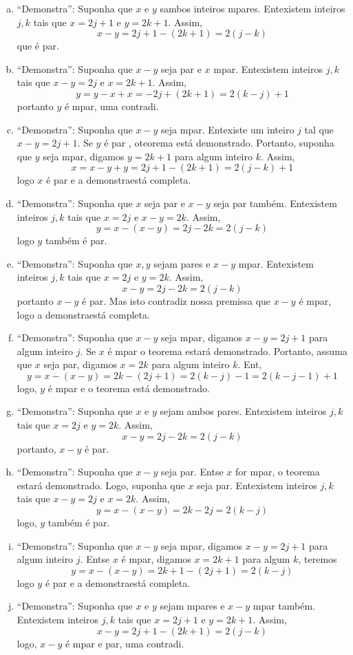 \begin{enumerate}[{\bf 1.}]
\begin{enumerate}[a)]
\item ``Demonstra'': Suponha que $x$ e $y$ s\ao ambos inteiros \ih mpares. Ent\ao existem inteiros $j,k$ tais que $x=2j+1$ e $y=2k+1$. Assim,
\[
x-y=2j+1-(2k+1)=2(j-k)
\] 
que \'e par.
\item ``Demonstra'': Suponha que $x-y$ seja par e $x$ \ih mpar. Ent\ao existem inteiros $j,k$ tais que $x-y=2j$ e $x=2k+1$. Assim,
\[
y=y-x+x=-2j+(2k+1)=2(k-j)+1
\] 
portanto $y$ \'e \ih mpar, uma contradi\caoi.
\item ``Demonstra'': Suponha que $x-y$ seja \ih mpar. Ent\ao existe um inteiro $j$ tal que $x-y=2j+1$. Se $y$ \'e par , oteorema est\'a demonstrado. Portanto, suponha que $y$ seja \ih mpar, digamos $y=2k+1$ para algum inteiro $k$. Assim,
\[
x=x-y+y=2j+1-(2k+1)=2(j-k)+1
\]
logo $x$ \'e par e a demonstra\cao est\'a completa.
\item ``Demonstra'': Suponha que $x$ seja par e $x-y$ seja par tamb\'em. Ent\ao existem inteiros $j,k$ tais que $x=2j$ e $x-y=2k$. Assim,
\[
y=x-(x-y)=2j-2k=2(j-k)
\]
logo $y$ tamb\'em \'e par.
\item ``Demonstra'': Suponha que $x,y$ sejam pares e $x-y$ \ih mpar. Ent\ao existem inteiros $j,k$ tais que $x=2j$ e $y=2k$. Assim,
\[
x-y=2j-2k=2(j-k)
\] 
portanto $x-y$ \'e par. Mas isto contradiz nossa premissa que $x-y$ \'e \ih mpar, logo a demonstra\cao est\'a completa.
\item ``Demonstra'': Suponha que $x-y$ seja \ih mpar, digamos $x-y=2j+1$ para algum inteiro $j$. Se $x$ \'e \ih mpar o teorema estar\'a demonstrado. Portanto, assuma que $x$ seja par, digamos $x=2k$ para algum inteiro $k$. Ent\aoi,
\[
y=x-(x-y)=2k-(2j+1)=2(k-j)-1=2(k-j-1)+1
\]
logo, $y$ \'e \ih mpar e o teorema est\'a demonstrado.
\item ``Demonstra'': Suponha que $x$ e $y$ sejam ambos pares. Ent\ao existem inteiros $j,k$ tais que $x=2j$ e $y=2k$. Assim,
\[
x-y=2j-2k=2(j-k)
\]
portanto, $x-y$ \'e par.
\item ``Demonstra'': Suponha que $x-y$ seja par. Ent\ao se $x$ for \ih mpar, o teorema estar\'a demonstrado. Logo, suponha que $x$ seja par. Ent\ao existem inteiros $j,k$ tais que $x-y=2j$ e $x=2k$. Assim, 
\[
y=x-(x-y)=2k-2j=2(k-j)
\]
logo, $y$ tamb\'em \'e par.
\item ``Demonstra'': Suponha que $x-y$ seja \ih mpar, digamos $x-y=2j+1$ para algum inteiro $j$. Ent\ao se $x$ \'e \ih mpar, digamos $x=2k+1$ para algum $k$, teremos
\[
y=x-(x-y)=2k+1-(2j+1)=2(k-j)
\]
logo $y$ \'e par e a demonstra\cao est\'a completa.
\item ``Demonstra'': Suponha que $x$ e $y$ sejam \ih mpares e $x-y$ \ih mpar tamb\'em. Ent\ao existem inteiros $j,k$ tais que $x=2j+1$ e $y=2k+1$. Assim,
\[
x-y=2j+1-(2k+1)=2(j-k)
\]
logo, $x-y$ \'e \ih mpar e par, uma contradi\caoi.
\end{enumerate}


\end{enumerate}
